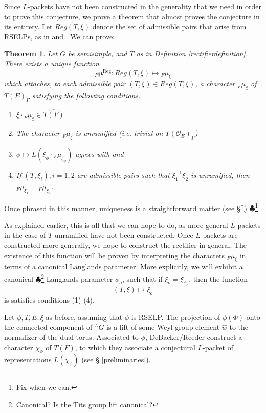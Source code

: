 \documentclass[11pt]{amsart}
\theoremstyle{plain}
\newtheorem{theorem}{Theorem}[section]
\newcommand{\MAxxx}[1]{$\clubsuit$\footnote{#1}}
\theoremstyle{definition}
\begin{document}
Since $L$-packets have not been constructed in the generality that
we need in order to prove this conjecture, we prove a theorem that
almost proves the conjecture in its entirety.  Let $Reg(T, \xi)$ denote
the set of admissible pairs that arise from RSELPs,
as in \cite{debackerreeder} and \cite{reeder}.  We can prove:

\begin{theorem}\label{regularrectifierdefinition}
Let $G$ be semisimple, and $T$ as in Definition \ref{rectifierdefinition}.
There exists a unique function $${}_F
  \boldsymbol\mu^{\mathrm{Reg}} : Reg(T, \xi) \mapsto {}_F \mu_{\xi}$$ which attaches,
  to each admissible pair $(T, \xi) \in Reg(T,\xi)$, a character ${}_F
  \mu_{\xi}$ of $T(E)_{\Gamma}$ satisfying the following conditions.

\begin{enumerate}
\item $\xi \cdot {}_F \mu_{\xi} \in \widehat{T(F)}$

\item The character ${}_F \mu_{\xi}$ is unramified (i.e. trivial on
  $T(\mathcal{O}_E)_{\Gamma}$)

\item $\phi \mapsto L(\xi_{\phi} \cdot {}_F \mu_{\xi_{\phi}})$
  agrees with \cite{debackerreeder} and \cite{reeder}

\item If $(T, \xi_i), i = 1,2$ are admissible pairs  such that
$\xi_1^{-1} \xi_2$ is unramified, then
${}_F \mu_{\xi_1} = {}_F \mu_{\xi_2}$.
\end{enumerate}
\end{theorem}

Once phrased in this manner, uniqueness is a straightforward matter
(see \S\ref{}) \MAxxx{Fix when we can.}.

As explained earlier, this is all that we can hope to do,
as more general $L$-packets in the case of $T$ unramified have not been
constructed.  Once $L$-packets are constructed more generally, we hope to
construct the rectifier in general.  The existence of this function
will be proven by interpreting the characters ${}_F \mu_{\xi}$
in terms of a canonical Langlands parameter.  More explicitly,
we will exhibit a canonical
\MAxxx{Canonical?  Is the Tits group lift canonical?} Langlands
parameter $\phi_{o}$, such that if $\xi_o = \xi_{\phi_o}$, then the
function $$(T, \xi) \mapsto \xi_o$$ is satisfies conditions (1)-(4).

Let $\phi, T, E, \xi$ as before, assuming that $\phi$ is RSELP.
The projection of $\phi(\Phi)$ onto the connected component of ${}^L
G$ is a lift of some Weyl group element $\hat{w}$ to the normalizer of
the dual torus.  Associated to $\phi$, DeBacker/Reeder construct a
character $\chi_{\phi}$ of $T(F)$, to which they associate a
conjectural $L$-packet of representations $L(\chi_{\phi})$ (see \S
\ref{preliminaries}).
\end{document}
